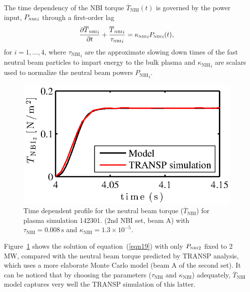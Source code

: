 \documentclass[12pt,lot, lof]{puthesis}
\begin{document}
The time dependency of the NBI torque $\overline{T}_\text{NBI}(t)$ is governed by the power input, $ {P_\textrm{\tiny{NBI}}}_i$ through a first-order lag
 \begin{equation}
\frac{{\partial \overline{T}_\textrm{\tiny{NBI}}}_i}{\partial t}
+ \frac{{\overline{T}_\textrm{\tiny{NBI}}}_i}{{\tau_\textrm{\tiny{NBI}}}_i}  = {\kappa_\textrm{\tiny{NBI}}}_i {P_\textrm{\tiny{NBI}}}_i(t), \label{eqn19}
\end{equation}
for $i=1,...,4$, where ${\tau_\text{NBI}}_i$ are the approximate slowing down times of the fast neutral beam particles to impart energy to the bulk plasma and ${\kappa_\text{NBI}}_i$ are scalars used to normalize the neutral beam powers ${P_\text{NBI}}_i$.
%
\begin{figure} 
\centering
\includegraphics [width=0.8 \linewidth]{chap10/fig5} 
\caption{Time dependent profile for the neutral beam torque ($ \overline{T}_\text{NBI} $) for
  plasma simulation 142301. (2nd NBI set, beam A) with $\tau_\text{NBI} = 0.008\,\text{s}$ and  $\kappa_\text{NBI} =
  1.3\times10^{-5}$.}
\label{NBI2}
\end{figure}

Figure~\ref{NBI2} shows the solution of equation~(\ref{eqn19}) with only $ {P_\textrm{\tiny{NBI}}}_2$ fixed to 2 MW, compared with the neutral beam torque predicted by TRANSP analysis, which uses a more elaborate Monte Carlo model (beam A of the second set). It can be noticed that by choosing the parameters ($\tau_\text{NBI}$ and $\kappa_\text{NBI}$) adequately, $ \overline{T}_\text{NBI} $ model captures very well the TRANSP simulation of this latter. 
\end{document}
